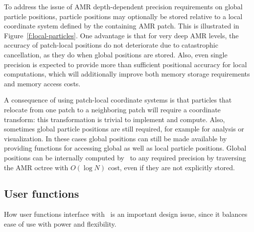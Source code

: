 \documentclass[10pt]{article}
\begin{document}
To address the issue of AMR depth-dependent precision requirements on
global particle positions, particle positions may optionally be stored
relative to a local coordinate system defined by the containing AMR
patch.  This is illustrated in Figure~\ref{f:local-particles}.  One
advantage is that for very deep AMR levels, the accuracy of
patch-local positions do not deteriorate due to catastrophic
cancellation, as they do when global positions are stored.  Also, even
single precision is expected to provide more than sufficient
positional accuracy for local computations, which will additionally
improve both memory storage requirements and memory access costs.


A consequence of using patch-local coordinate systems is that
particles that relocate from one patch to a neighboring patch will
require a coordinate transform: this transformation is trivial to
implement and compute.  Also, sometimes global particle positions are
still required, for example for analysis or visualization.  In these
cases global positions can still be made available by providing
functions for accessing global as well as local particle positions.
Global positions can be internally computed by \cello\ to any required
precision by traversing the AMR octree with $O(\log N)$ cost, even
if they are not explicitly stored.

\subsection{User functions} \label{ss:design-user}

How user functions interface with \cello\ is an important design
issue, since it balances ease of use with power and flexibility.  
\end{document}
